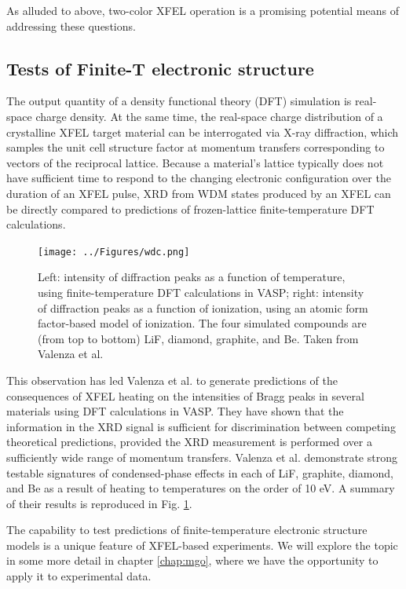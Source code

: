 \documentclass [11pt, proquest, article] {uwthesis}[2016/11/22]
\begin{document}
As alluded to above, two-color XFEL operation is a promising potential means of addressing these questions. 

\subsection{Tests of Finite-T electronic structure}
\label{finite_t_theory}
The output quantity of a density functional theory (DFT) simulation is real-space charge density. At the same time, the real-space charge distribution of a crystalline XFEL target material can be interrogated via X-ray diffraction, which samples the unit cell structure factor at momentum transfers corresponding to vectors of the reciprocal lattice. Because a material's lattice typically does not have sufficient time to respond to the changing electronic configuration over the duration of an XFEL pulse, XRD from WDM states produced by an XFEL can be directly compared to predictions of frozen-lattice finite-temperature DFT calculations.

\begin{figure}[h] 
\caption{Left: intensity of diffraction peaks as a function of temperature, using finite-temperature DFT calculations in VASP; right: intensity of diffraction peaks as a function of ionization, using an atomic form factor-based model of ionization. The four simulated compounds are (from top to bottom) LiF, diamond, graphite, and Be. Taken from Valenza et al.\cite{valenza2016warm}}
\label{fig:wdc}
\centering
\texttt{[image: ../Figures/wdc.png]}
\end{figure}

\FloatBarrier

This observation has led Valenza et al. to generate predictions of the consequences of XFEL heating on the intensities of Bragg peaks in several materials using DFT calculations in VASP.\cite{valenza2016warm} They have shown that the information in the XRD signal is sufficient for discrimination between competing theoretical predictions, provided the XRD measurement is performed over a sufficiently wide range of momentum transfers. Valenza et al. demonstrate strong testable signatures of condensed-phase effects in each of LiF, graphite, diamond, and Be as a result of heating to temperatures on the order of 10 eV. A summary of their results is reproduced in Fig. \ref{fig:wdc}.


The capability to test predictions of finite-temperature electronic structure models is a unique feature of XFEL-based experiments. We will explore the topic in some more detail in chapter \ref{chap:mgo}, where we have the opportunity to apply it to experimental data. 
\end{document}
